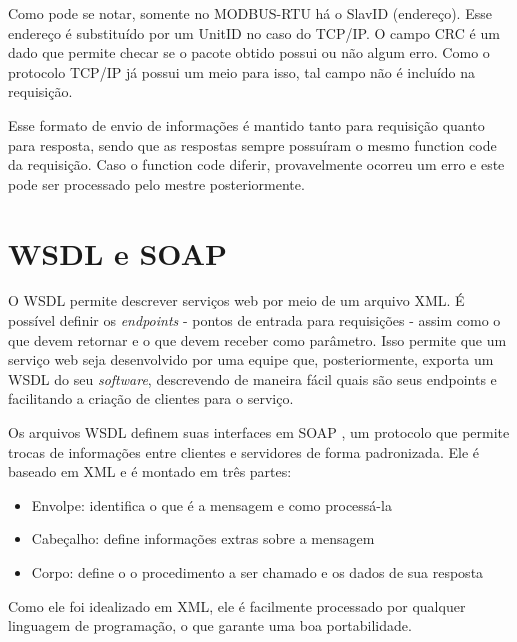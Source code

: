Como pode se notar, somente no MODBUS-RTU há o SlavID (endereço). Esse endereço é substituído por um UnitID no caso do TCP/IP. O campo CRC é um dado que permite checar se o pacote obtido possui ou não algum erro. Como o protocolo TCP/IP já possui um meio para isso, tal campo não é incluído na requisição.

Esse formato de envio de informações é mantido tanto para requisição quanto para resposta, sendo que as respostas sempre possuíram o mesmo function code da requisição. Caso o function code diferir, provavelmente ocorreu um erro e este pode ser processado pelo mestre posteriormente.

\section{WSDL e SOAP}

O WSDL \cite{wsdlspec} permite descrever serviços web por meio de um arquivo XML. É possível definir os \textit{endpoints} - pontos de entrada para requisições - assim como o que devem retornar e o que devem receber como parâmetro. Isso permite que um serviço web seja desenvolvido por uma equipe que, posteriormente, exporta um WSDL do seu \textit{software}, descrevendo de maneira fácil quais são seus endpoints e facilitando a criação de clientes para o serviço.

Os arquivos WSDL definem suas interfaces em SOAP \cite{soapspec}, um protocolo que permite trocas de informações entre clientes e servidores de forma padronizada. Ele é baseado em XML e é montado em três partes:
\begin{itemize}
  \item Envolpe: identifica o que é a mensagem e como processá-la
  \item Cabeçalho: define informações extras sobre a mensagem
  \item Corpo: define o o procedimento a ser chamado e os dados de sua resposta
\end{itemize}

Como ele foi idealizado em XML, ele é facilmente processado por qualquer linguagem de programação, o que garante uma boa portabilidade.
